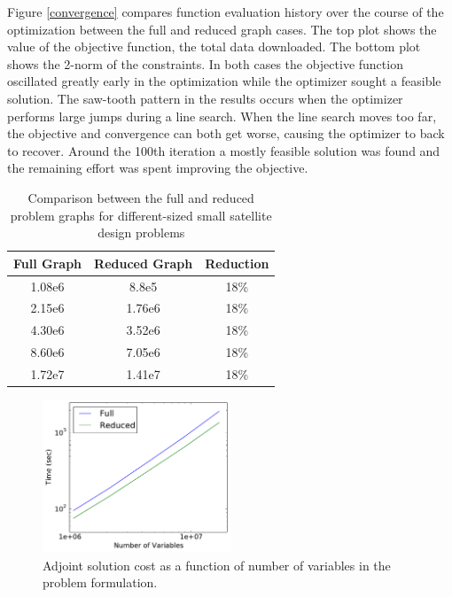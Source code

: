 \documentclass[]{aiaa-tc} %
\begin{document}
          
            Figure \ref{convergence} compares function evaluation history over the course of
            the optimization between the full and reduced graph cases. The top plot shows the value of the objective function, the total data downloaded.
            The bottom plot shows the 2-norm of the constraints. In both cases the objective function oscillated greatly early in the optimization while 
            the optimizer sought a feasible solution. The saw-tooth pattern in the results occurs when the optimizer performs large
            jumps during a line search. When the line search moves too far, the objective and convergence can both get worse, causing the 
            optimizer to back to recover. Around the 100th iteration a mostly feasible solution was found and
            the remaining effort was spent improving the objective.

            \begin{table}
              \centering
              \caption{Comparison between the full and reduced problem graphs for different-sized small satellite design problems}
                \begin{tabular}{c c c}
                    \toprule
                    Full Graph & Reduced Graph & Reduction\\
                    \midrule
                    1.08e6 & 8.8e5 &  18\%\\
                    2.15e6 & 1.76e6 & 18\%\\
                    4.30e6 & 3.52e6 & 18\%\\
                    8.60e6 & 7.05e6 & 18\%\\
                    1.72e7 & 1.41e7 & 18\%\\
                    \bottomrule
                \end{tabular}
                \label{tab:cadre-problem-sizes}
            \end{table}


            \begin{figure}[!htbp]
                \centering
                \includegraphics[width=0.5\textwidth]{images/cadre_var_scaling}
                \caption{Adjoint solution cost as a function of number of variables in the problem formulation.}
                \label{fig:cadre-compute-cost}
            \end{figure}
\end{document}
